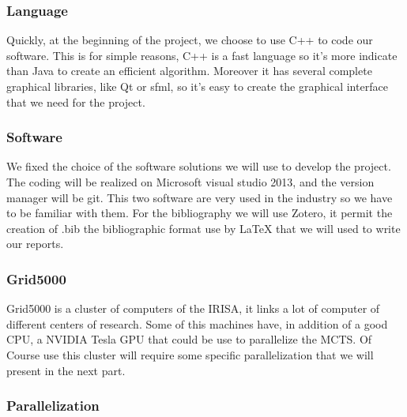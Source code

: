 \subsubsection{Language}
	Quickly, at the beginning of the project, we choose to use C++ to code our software. This is for simple reasons, C++ is a fast language so it's more indicate than Java to create an efficient algorithm.  Moreover it has several complete graphical libraries, like Qt or sfml, so it's easy to create the graphical interface that we need for the project.

\subsubsection{Software}
	We fixed the choice of the software solutions we will use to develop the project. The coding  will be realized on Microsoft visual studio 2013, and the version manager will be git. This two software are very used in the industry so we have to be familiar with them.
For the bibliography we will use Zotero, it permit the creation of .bib the bibliographic format use by LaTeX that we will used to write our reports.

\subsubsection{Grid5000}
	Grid5000 is a cluster of computers of the IRISA, it links a lot of computer of different centers of research. Some of this machines have, in addition of a good CPU, a NVIDIA Tesla GPU that could be use to parallelize the MCTS. Of Course use this cluster will require some specific parallelization that we will present in the next part.

\subsubsection{Parallelization}

